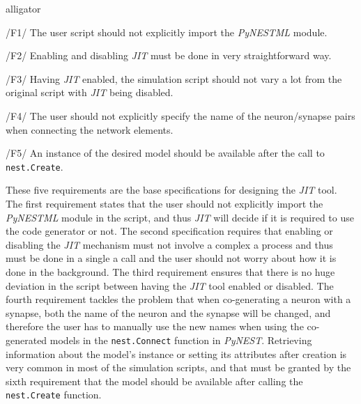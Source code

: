 \begin{labeling}{alligator}
   \item  [/F1/] The user script should not explicitly import the \emph{PyNESTML} module. \\
   
     
   \item [/F2/] Enabling and disabling \emph{JIT} must be done in very straightforward way.\\
   
   \item  [/F3/] Having \emph{JIT} enabled, the simulation script should not vary a lot from the original script with \emph{JIT} being disabled.\\
 
   \item  [/F4/]\label{req:F4} The user should not explicitly specify the name of the neuron/synapse pairs when connecting the network elements.\\
   
   \item  [/F5/] An instance of the desired model should be available after the call to \texttt{nest.Create}.\\
   
\end{labeling}

These five requirements are the base specifications for designing the \emph{JIT} tool. The first requirement states that the user should not explicitly import the \emph{PyNESTML} module in the script, and thus \emph{JIT} will decide if it is required to use the code generator or not. The second specification requires that enabling or disabling the \emph{JIT} mechanism must not involve a complex a process and thus must be done in a single a call and the user should not worry about how it is done in the background. The third requirement ensures that there is no huge deviation in the script between having the \emph{JIT} tool enabled or disabled. The fourth requirement tackles the problem that when co-generating a neuron with a synapse, both the name of the neuron and the synapse will be changed, and therefore the user has to manually use the new names when using the co-generated models in the \texttt{nest.Connect} function in \emph{PyNEST}. Retrieving information about the model's instance or setting its attributes after creation is very common in most of the simulation scripts, and that must be granted by the sixth requirement that the model should be available after calling the \texttt{nest.Create} function.

